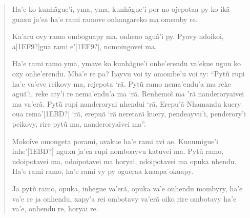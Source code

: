 \pagebreak
\openleft
\begin{quotation}
Ha’e ko kunhãgue’i, yma, yma, kunhãgue’i por no ojepotaa py ko ikã guaxu
ja’ea ha’e rami ramove onhangareko ma omemby re. 

Ka’aru ovy ramo omboguapy ma, onheno aguã’i py. Pyavy ndoikoi,
a[1EF9?]gua rami e’[1EF9?], nomoingovei ma. 

Ha’e rami ramo yma, ymave ko kunhãgue’i onhe’erendu va’ekue nguu ko oxy
onhe’erendu. Mba’e re pa? Ijayvu voi ty omombe’u voi ty: ``Pytũ rupi
ha’e va’eve reikovy ma, rejepota ‘rã. Pytũ ramo nema’endu’a ma reke
aguã’i, reke aty’i re nema’endu’a ma ‘rã. Renhemoĩ ma ’rã
nanderoryaivei ma va’erã. Pytũ rupi nanderoryai nhendui ‘rã.  Erepu’ã
Nhamandu kuery oua rema’[1EBD?] ‘rã, erepuã ‘rã neretarã kuery,
pendeayvu’i, penderory’i peikovy, rire pytũ ma, nanderoryaivei ma''. 

Mokoĩve omongeta porami, avakue ha’e rami avi ae. Kunumigue’i
inhe’[1EBD?] nguxu ja’ea rupi nomboayvu katuvei ma. Pytũ ramo,
ndoipotavei ma, ndoipotavei ma horyai, ndoipotavei ma opuka nhendu.
Ha’e rami ramo, ha’e rami vy py ogueraa kuaapa okuapy. 

Ja pytũ ramo, opuka, inhegue va’erã, opuka va’e onhendu mombyry, ha’e
va’e re ja onhendu, xapy’a rei ombotavy va’erã oiko rire ombotavy ha’e
va’e, onhendu re, horyai re.
\end{quotation}
\pagebreak

